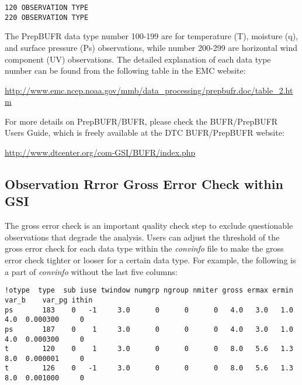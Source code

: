 \begin{scriptsize}
\begin{verbatim}
120 OBSERVATION TYPE
220 OBSERVATION TYPE
\end{verbatim}
\end{scriptsize}

The PrepBUFR data type number 100-199 are for temperature (T), moisture (q), and surface pressure (Ps) observations, while number 200-299 are horizontal wind component (UV) observations. The detailed explanation of each data type number can be found from the following table in the EMC website: 

\begin{small}
\url{http://www.emc.ncep.noaa.gov/mmb/data_processing/prepbufr.doc/table_2.htm}
\end{small}

For more details on PrepBUFR/BUFR, please check the BUFR/PrepBUFR User\textquotesingle s Guide, which is freely available at the DTC BUFR/PrepBUFR website:

\begin{small}
\url{http://www.dtcenter.org/com-GSI/BUFR/index.php}
\end{small}

\subsection{Observation Rrror Gross Error Check within GSI}

The gross error check is an important quality check step to exclude questionable observations that degrade the analysis. Users can adjust the threshold of the gross error check for each data type within the \textit{convinfo} file to make the gross error check tighter or looser for a certain data type. For example, the following is a part of \textit{convinfo} without the last five columns:

\begin{scriptsize}
\begin{verbatim}
!otype  type  sub iuse twindow numgrp ngroup nmiter gross ermax ermin var_b    var_pg ithin
ps       183    0   -1     3.0      0      0      0   4.0   3.0   1.0   4.0  0.000300     0
ps       187    0    1     3.0      0      0      0   4.0   3.0   1.0   4.0  0.000300     0
t        120    0    1     3.0      0      0      0   8.0   5.6   1.3   8.0  0.000001     0
t        126    0   -1     3.0      0      0      0   8.0   5.6   1.3   8.0  0.001000     0
\end{verbatim}
\end{scriptsize}
 
